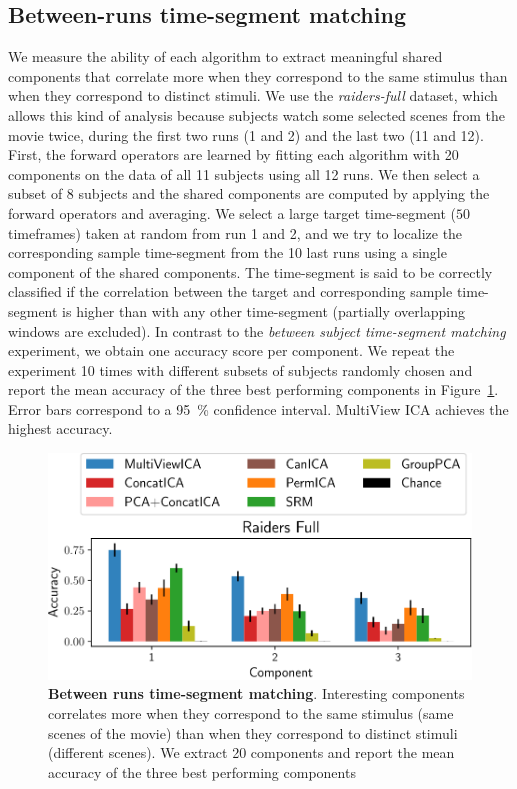 \subsection{Between-runs time-segment matching}
\label{app_spatialmaps}
We measure the ability of each algorithm to extract meaningful shared components that correlate more when they correspond to the same stimulus than when they correspond to distinct stimuli. We use the \emph{raiders-full} dataset, which allows this kind of analysis because subjects watch some selected scenes from the movie twice, during the first two runs (1 and 2) and the last two (11 and 12).
%
First, the forward operators are learned by fitting each algorithm with 20 components on the data of all 11 subjects using all 12 runs. We then select a subset of 8 subjects and the shared components are computed by applying the forward operators and averaging.
%
We select a large target time-segment ($50$
timeframes) taken at random from run 1 and 2, and we try to localize the corresponding sample time-segment from the 10 last runs using a single component of the shared components.
%
The time-segment is said to be
correctly classified if the correlation between the target and corresponding sample
time-segment is higher than with any other time-segment (partially overlapping windows are excluded).
%
In contrast to the \emph{between subject time-segment matching} experiment, we obtain one accuracy score per component.
%
We repeat the experiment 10 times with different subsets of subjects randomly chosen and report the mean accuracy of the three best performing components in Figure~\ref{fig:swetha}. Error bars correspond to a 95~\% confidence interval.
%
MultiView ICA achieves the highest accuracy.

\begin{figure}
  \centering
  \includegraphics[width=\textwidth]{figures/mvica/swetha_exp_full_fit.pdf}
  \caption{\textbf{Between runs time-segment matching}. Interesting components correlates more when they correspond to the same stimulus (same scenes of the movie) than when they correspond to distinct stimuli (different scenes).
  We extract 20 components and report the mean accuracy of the three best performing components}
  \label{fig:swetha}
\end{figure}


